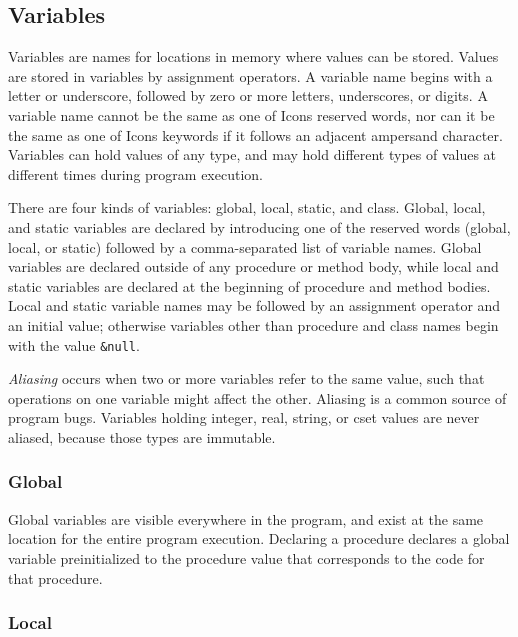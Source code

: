\subsection{Variables}

Variables are names for locations in memory where values can be stored.
Values are stored in variables by assignment
operators. A variable name begins with a letter or
underscore, followed by zero or more letters, underscores, or digits. A
variable name cannot be the same as one of Icon{\textquotesingle}s
reserved words, nor can it be the same as one of
Icon{\textquotesingle}s keywords if it follows an adjacent ampersand
character. Variables can hold values of any type, and may hold
different types of values at different times during program execution.

There are four kinds of variables: global,
local, static, and class. Global,
local, and static variables are declared by introducing one of the
reserved words (\textsf{global}, \textsf{local}, or \textsf{static})
followed by a comma-separated list of variable names. Global variables
are declared outside of any procedure or method body, while local and
static variables are declared at the beginning of procedure and method
bodies. Local and static variable names may be followed by
an assignment operator and an initial value; otherwise variables
other than procedure and class names begin with the value
\texttt{\&null}.

\textit{Aliasing} occurs when two or more variables
refer to the same value, such that operations on one variable might
affect the other. Aliasing is a common source of program bugs.
Variables holding integer, real, string, or cset values are never
aliased, because those types are immutable.

\subsubsection{Global}

Global variables are visible everywhere in the program, and exist at the
same location for the entire program execution. Declaring a procedure
declares a global variable preinitialized to the procedure value
that corresponds to the code for that procedure.

\subsubsection{Local}

